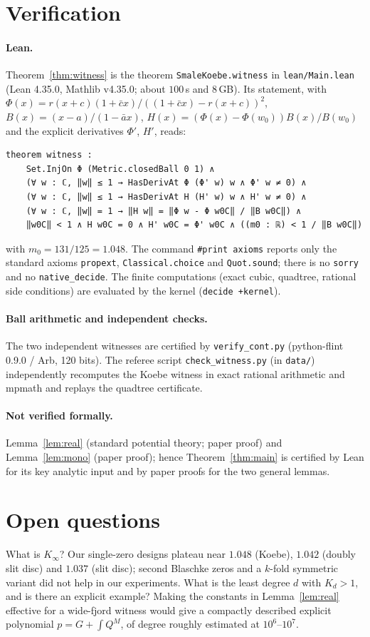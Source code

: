 \documentclass[11pt]{article}
\numberwithin{equation}{section}
\theoremstyle{definition}
\theoremstyle{remark}
\begin{document}
\section{Verification}
\paragraph{Lean.} Theorem~\ref{thm:witness} is the theorem \texttt{SmaleKoebe.witness} in
\texttt{lean/Main.lean} (Lean 4.35.0, Mathlib v4.35.0; about $100$\,s and $8$\,GB). Its statement, with
$\Phi(x)=r(x+c)(1+\bar cx)/((1+\bar cx)-r(x+c))^2$,
$B(x)=(x-a)/(1-\bar ax)$, $H(x)=(\Phi(x)-\Phi(w_0))B(x)/B(w_0)$ and the explicit derivatives
$\Phi'$, $H'$, reads:
\begin{lstlisting}
theorem witness :
    Set.InjOn Φ (Metric.closedBall 0 1) ∧
    (∀ w : ℂ, ‖w‖ ≤ 1 → HasDerivAt Φ (Φ' w) w ∧ Φ' w ≠ 0) ∧
    (∀ w : ℂ, ‖w‖ ≤ 1 → HasDerivAt H (H' w) w ∧ H' w ≠ 0) ∧
    (∀ w : ℂ, ‖w‖ = 1 → ‖H w‖ = ‖Φ w - Φ w0C‖ / ‖B w0C‖) ∧
    ‖w0C‖ < 1 ∧ H w0C = 0 ∧ H' w0C = Φ' w0C ∧ ((m0 : ℝ) < 1 / ‖B w0C‖)
\end{lstlisting}
with $m_0=131/125=1.048$. The command \texttt{\#print axioms} reports only the standard axioms
\texttt{propext}, \texttt{Classical.choice} and \texttt{Quot.sound}; there is no \texttt{sorry} and no \texttt{native\_decide}. The finite computations
(exact cubic, quadtree, rational side conditions) are evaluated by the kernel
(\texttt{decide +kernel}).
\paragraph{Ball arithmetic and independent checks.} The two independent witnesses are certified by
\texttt{verify\_cont.py} (python-flint 0.9.0 / Arb, 120 bits). The referee script
\texttt{check\_witness.py} (in \texttt{data/}) independently recomputes the Koebe witness in exact rational arithmetic
and mpmath and replays the quadtree certificate.
\paragraph{Not verified formally.} Lemma~\ref{lem:real} (standard potential theory; paper proof) and
Lemma~\ref{lem:mono} (paper proof); hence Theorem~\ref{thm:main} is certified by Lean for its key analytic
input and by paper proofs for the two general lemmas.

\section{Open questions}
What is $K_\infty$? Our single-zero designs plateau near $1.048$ (Koebe), $1.042$ (doubly slit disc)
and $1.037$ (slit disc); second Blaschke zeros and a $k$-fold symmetric variant did not help in our
experiments. What is the least degree $d$ with $K_d>1$, and is there an explicit example? Making the
constants in Lemma~\ref{lem:real} effective for a wide-fjord witness would give a compactly described
explicit polynomial $p=G+\int Q^M$, of degree roughly estimated at $10^6$--$10^7$.
\end{document}
